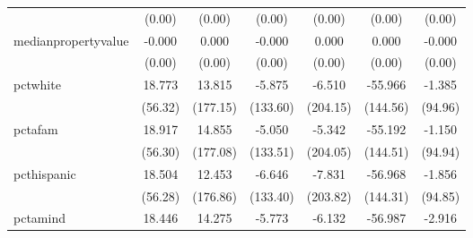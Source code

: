 {\begin{tabular}{l*{6}{c}}
            &                   (0.00)         &                   (0.00)         &                   (0.00)         &                   (0.00)         &                   (0.00)         &                   (0.00)         \\
medianpropertyvalue&                   -0.000         &                    0.000         &                   -0.000         &                    0.000         &                    0.000         &                   -0.000         \\
            &                   (0.00)         &                   (0.00)         &                   (0.00)         &                   (0.00)         &                   (0.00)         &                   (0.00)         \\
pctwhite    &                   18.773         &                   13.815         &                   -5.875         &                   -6.510         &                  -55.966         &                   -1.385         \\
            &                  (56.32)         &                 (177.15)         &                 (133.60)         &                 (204.15)         &                 (144.56)         &                  (94.96)         \\
pctafam     &                   18.917         &                   14.855         &                   -5.050         &                   -5.342         &                  -55.192         &                   -1.150         \\
            &                  (56.30)         &                 (177.08)         &                 (133.51)         &                 (204.05)         &                 (144.51)         &                  (94.94)         \\
pcthispanic &                   18.504         &                   12.453         &                   -6.646         &                   -7.831         &                  -56.968         &                   -1.856         \\
            &                  (56.28)         &                 (176.86)         &                 (133.40)         &                 (203.82)         &                 (144.31)         &                  (94.85)         \\
pctamind    &                   18.446         &                   14.275         &                   -5.773         &                   -6.132         &                  -56.987         &                   -2.916         \\

\end{tabular}}
